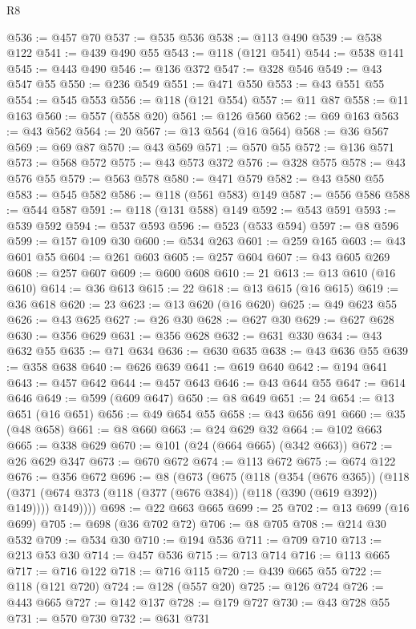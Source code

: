 \begin{lexlean}{R8}
\begin{coremodule}
@536 := @457 @70
@537 := @535 @536
@538 := @113 @490
@539 := @538 @122
@541 := @439 @490 @55
@543 := @118 (@121 @541)
@544 := @538 @141
@545 := @443 @490
@546 := @136 @372
@547 := @328 @546
@549 := @43 @547 @55
@550 := @236 @549
@551 := @471 @550
@553 := @43 @551 @55
@554 := @545 @553
@556 := @118 (@121 @554)
@557 := @11 @87
@558 := @11 @163
@560 := @557 (@558 @20)
@561 := @126 @560
@562 := @69 @163
@563 := @43 @562
@564 := 20
@567 := @13 @564 (@16 @564)
@568 := @36 @567
@569 := @69 @87
@570 := @43 @569
@571 := @570 @55
@572 := @136 @571
@573 := @568 @572
@575 := @43 @573 @372
@576 := @328 @575
@578 := @43 @576 @55
@579 := @563 @578
@580 := @471 @579
@582 := @43 @580 @55
@583 := @545 @582
@586 := @118 (@561 @583) @149
@587 := @556 @586
@588 := @544 @587
@591 := @118 (@131 @588) @149
@592 := @543 @591
@593 := @539 @592
@594 := @537 @593
@596 := @523 (@533 @594)
@597 := @8 @596
@599 := @157 @109 @30
@600 := @534 @263
@601 := @259 @165
@603 := @43 @601 @55
@604 := @261 @603
@605 := @257 @604
@607 := @43 @605 @269
@608 := @257 @607
@609 := @600 @608
@610 := 21
@613 := @13 @610 (@16 @610)
@614 := @36 @613
@615 := 22
@618 := @13 @615 (@16 @615)
@619 := @36 @618
@620 := 23
@623 := @13 @620 (@16 @620)
@625 := @49 @623 @55
@626 := @43 @625
@627 := @26 @30
@628 := @627 @30
@629 := @627 @628
@630 := @356 @629
@631 := @356 @628
@632 := @631 @330
@634 := @43 @632 @55
@635 := @71 @634
@636 := @630 @635
@638 := @43 @636 @55
@639 := @358 @638
@640 := @626 @639
@641 := @619 @640
@642 := @194 @641
@643 := @457 @642
@644 := @457 @643
@646 := @43 @644 @55
@647 := @614 @646
@649 := @599 (@609 @647)
@650 := @8 @649
@651 := 24
@654 := @13 @651 (@16 @651)
@656 := @49 @654 @55
@658 := @43 @656 @91
@660 := @35 (@48 @658)
@661 := @8 @660
@663 := @24 @629 @32
@664 := @102 @663
@665 := @338 @629
@670 := @101 (@24 (@664 @665) (@342 @663))
@672 := @26 @629 @347
@673 := @670 @672
@674 := @113 @672
@675 := @674 @122
@676 := @356 @672
@696 := @8
    (@673
      (@675
        (@118
          (@354 (@676 @365))
          (@118 (@371 (@674 @373 (@118 (@377 (@676 @384)) (@118 (@390 (@619 @392)) @149)))) @149))))
@698 := @22 @663 @665
@699 := 25
@702 := @13 @699 (@16 @699)
@705 := @698 (@36 @702 @72)
@706 := @8 @705
@708 := @214 @30 @532
@709 := @534 @30
@710 := @194 @536
@711 := @709 @710
@713 := @213 @53 @30
@714 := @457 @536
@715 := @713 @714
@716 := @113 @665
@717 := @716 @122
@718 := @716 @115
@720 := @439 @665 @55
@722 := @118 (@121 @720)
@724 := @128 (@557 @20)
@725 := @126 @724
@726 := @443 @665
@727 := @142 @137
@728 := @179 @727
@730 := @43 @728 @55
@731 := @570 @730
@732 := @631 @731

\end{coremodule}
\end{lexlean}
